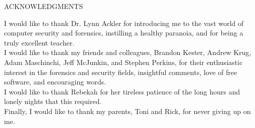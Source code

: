 \onehalfspacing
\begin{center}
ACKNOWLEDGMENTS \\[36pt]
\end{center}

\noindent
I would like to thank Dr. Lynn Ackler for introducing me to the vast world of computer security and forensics, instilling a healthy
paranoia, and for being a truly excellent teacher.  \\[12pt]

\noindent
I would like to thank my friends and colleagues, Brandon Kester, Andrew Krug, Adam Maschinchi, Jeff McJunkin, and Stephen Perkins,
for their enthusiastic interest in the forensics and security fields, insightful comments, love of free software, and encouraging
words. \\[12pt]
 
\noindent
I would like to thank Rebekah for her tireless patience of the long hours and lonely nights that this required. \\[12pt]
 
\noindent
Finally, I would like to thank my parents, Toni and Rick, for never giving up on me. \\[12pt]

\restoregeometry
